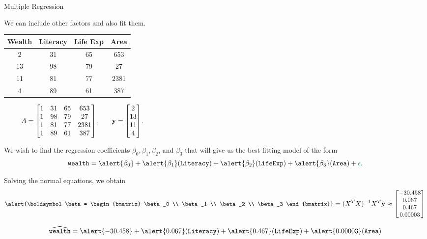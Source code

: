 \documentclass[xcolor=dvipsnames,aspectratio=169,t]{beamer}
\begin{document}
\begin{frame}{Multiple Regression}
  \smallskip
  
  We can include other factors and also fit them.
  \medskip

  {\small
  \begin{tabular}{c|c|c|c}
  Wealth & Literacy & Life Exp & Area\\
  \hline
  2 & 31 & 65 & 653\\
  13 & 98 & 79 & 27\\
  11 & 81 & 77 & 2381\\
  4 & 89 & 61 & 387\\
  \end{tabular} \ \ \ \ \ $\displaystyle A = \begin{bmatrix} 1 & 31 & 65 & 653 \\ 1 & 98 & 79 & 27 \\ 1 & 81 & 77 & 2381 \\ 1 & 89 & 61 & 387 \end{bmatrix}$, \ \ \  $\displaystyle \mathbf{y} = \begin{bmatrix} 2 \\ 13 \\ 11 \\ 4 \end{bmatrix}$. }

  We wish to find the regression coefficients $\beta_0, \beta_1, \beta_2$, and $\beta_3$ that will give us the best fitting model of the form
  \[ \texttt{wealth} = \alert{\beta_0} + \alert{\beta_1} (\texttt{Literacy}) + \alert{\beta_2} (\texttt{LifeExp}) + \alert{\beta_3} (\texttt{Area}) + \colorg{\epsilon}. \]
  
  \pause
  Solving the normal equations, we obtain
  \[ \small \alert{\boldsymbol\beta = 
  \begin{bmatrix} \beta_0 \\ \beta_1 \\  \beta_2 \\  \beta_3 \end{bmatrix}} 
  = (X^TX)^{-1} X^T \mathbf{y} \approx
  \begin{bmatrix} -30.458 \\ 0.067 \\ 0.467 \\ 0.00003 \end{bmatrix} \]

  \[ \widehat{\texttt{wealth}} = \alert{-30.458} + \alert{0.067 } (\texttt{Literacy}) + \alert{0.467} (\texttt{LifeExp}) + \alert{0.00003} (\texttt{Area})  \]
\end{frame}
\end{document}

